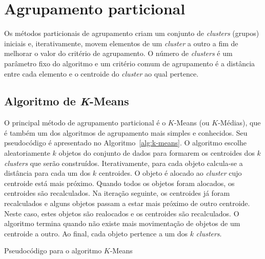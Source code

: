 \section{Agrupamento particional}

Os métodos particionais de agrupamento criam um conjunto de \textit{clusters} (grupos) iniciais e, iterativamente, movem elementos de um \textit{cluster} a outro a fim de melhorar o valor do critério de agrupamento. O número de \textit{clusters} é um parâmetro fixo do algoritmo e um critério comum de agrupamento é a distância entre cada elemento e o centroide do \textit{cluster} ao qual pertence.

\subsection{Algoritmo de \textit{K}-Means}

O principal método de agrupamento particional é o $K$-Means (ou $K$-Médias), que é também um dos algoritmos de agrupamento mais simples e conhecidos. Seu pseudocódigo é apresentado no Algoritmo~\ref{alg:k-means}. O algoritmo escolhe aleatoriamente $k$ objetos do conjunto de dados para formarem os centroides dos $k$ \textit{clusters} que serão construídos. Iterativamente, para cada objeto calcula-se a distância para cada um dos $k$ centroides. O objeto é alocado ao \textit{cluster} cujo centroide está mais próximo. Quando todos os objetos foram alocados, os centroides são recalculados. Na iteração seguinte, os centroides já foram recalculados e alguns objetos passam a estar mais próximo de outro centroide. Neste caso, estes objetos são realocados e os centroides são recalculados. O algoritmo termina quando não existe mais movimentação de objetos de um centroide a outro. Ao final, cada objeto pertence a um dos $k$ \textit{clusters}.

\begin{algorithm}[h]
	\DontPrintSemicolon
	
	
	\caption{Pseudocódigo para o algoritmo $K$-Means}
	\label{alg:k-means}
\end{algorithm}

